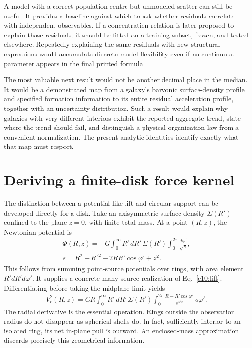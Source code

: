A model with a correct population centre but unmodeled scatter can still be useful. It provides a baseline against which to ask whether residuals correlate with independent observables. If a concentration relation is later proposed to explain those residuals, it should be fitted on a training subset, frozen, and tested elsewhere. Repeatedly explaining the same residuals with new structural expressions would accumulate discrete model flexibility even if no continuous parameter appears in the final printed formula.

The most valuable next result would not be another decimal place in the median. It would be a demonstrated map from a galaxy's baryonic surface-density profile and specified formation information to its entire residual acceleration profile, together with an uncertainty distribution. Such a result would explain why galaxies with very different interiors exhibit the reported aggregate trend, state where the trend should fail, and distinguish a physical organization law from a convenient normalization. The present analytic identities identify exactly what that map must respect.

\section{Deriving a finite-disk force kernel}

The distinction between a potential-like lift and circular support can be developed directly for a disk. Take an axisymmetric surface density $\Sigma(R')$ confined to the plane $z=0$, with finite total mass. At a point $(R,z)$, the Newtonian potential is
\begin{equation}
 \begin{split}
 \Phi(R,z)=-G\int_0^\infty R'\,dR'\,\Sigma(R')
 \int_0^{2\pi}\frac{d\varphi'}{\sqrt{s}},\\
 s=R^2+R'^2-2RR'\cos\varphi'+z^2.
 \end{split}
 \label{c10:diskkernel}
\end{equation}
This follows from summing point-source potentials over rings, with area element $R'dR'd\varphi'$. It supplies a concrete many-source realization of Eq.~\eqref{c10:lift}. Differentiating before taking the midplane limit yields
\begin{equation}
 \begin{split}
 V_c^2(R,z)=GR\int_0^\infty R'\,dR'\,\Sigma(R')
 \int_0^{2\pi}\frac{R-R'\cos\varphi'}{s^{3/2}}\,d\varphi'.
 \end{split}
 \label{c10:diskforcekernel}
\end{equation}
The radial derivative is the essential operation. Rings outside the observation radius do not disappear as spherical shells do. In fact, sufficiently interior to an isolated ring, its net in-plane pull is outward. An enclosed-mass approximation discards precisely this geometrical information.

